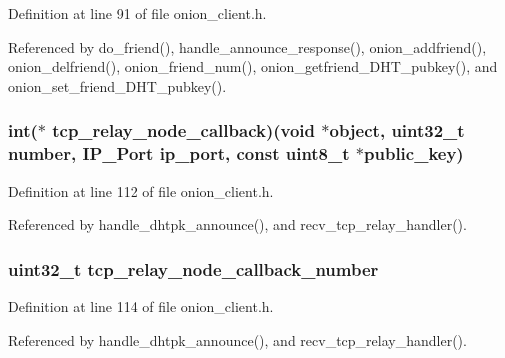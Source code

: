 Definition at line 91 of file onion\+\_\+client.\+h.



Referenced by do\+\_\+friend(), handle\+\_\+announce\+\_\+response(), onion\+\_\+addfriend(), onion\+\_\+delfriend(), onion\+\_\+friend\+\_\+num(), onion\+\_\+getfriend\+\_\+\+D\+H\+T\+\_\+pubkey(), and onion\+\_\+set\+\_\+friend\+\_\+\+D\+H\+T\+\_\+pubkey().

\hypertarget{struct_onion___friend_a62001c45ecd44d4c6321ca2358f4df5f}{
\subsubsection[{tcp\+\_\+relay\+\_\+node\+\_\+callback}]{\setlength{\rightskip}{0pt plus 5cm}int($\ast$ tcp\+\_\+relay\+\_\+node\+\_\+callback)(void $\ast$object, uint32\+\_\+t number, {\bf I\+P\+\_\+\+Port} ip\+\_\+port, const uint8\+\_\+t $\ast$public\+\_\+key)}}\label{struct_onion___friend_a62001c45ecd44d4c6321ca2358f4df5f}


Definition at line 112 of file onion\+\_\+client.\+h.



Referenced by handle\+\_\+dhtpk\+\_\+announce(), and recv\+\_\+tcp\+\_\+relay\+\_\+handler().

\hypertarget{struct_onion___friend_ab673fb84fe578fb5e7848f9f04c093cf}{
\subsubsection[{tcp\+\_\+relay\+\_\+node\+\_\+callback\+\_\+number}]{\setlength{\rightskip}{0pt plus 5cm}uint32\+\_\+t tcp\+\_\+relay\+\_\+node\+\_\+callback\+\_\+number}}\label{struct_onion___friend_ab673fb84fe578fb5e7848f9f04c093cf}


Definition at line 114 of file onion\+\_\+client.\+h.



Referenced by handle\+\_\+dhtpk\+\_\+announce(), and recv\+\_\+tcp\+\_\+relay\+\_\+handler().


